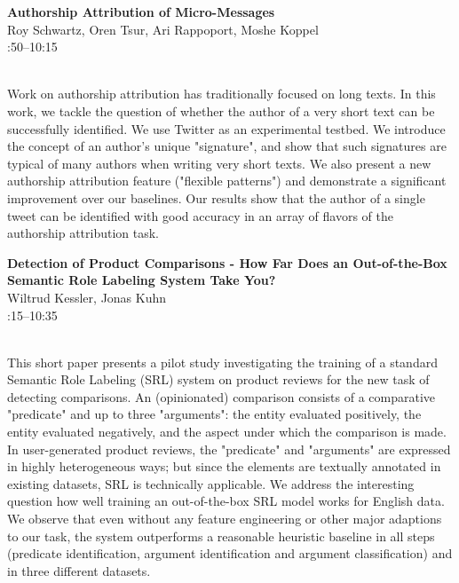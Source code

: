 \documentclass[twoside,makeidx]{book}
\renewcommand{\normalsize}{\fontsize{8}{9}\selectfont}
\renewcommand{\small}{\fontsize{7}{8}\selectfont}
\begin{document}
\par\vspace{2em}\noindent%
\begin{minipage}{\linewidth}%
\begin{center}
\textbf{\normalsize Authorship Attribution of Micro-Messages}\\
\normalsize  Roy Schwartz,  Oren Tsur,  Ari Rappoport,  Moshe Koppel\\
{\small 9:50--10:15}\\
\end{center}
\end{minipage}\\[0.5em]
\nopagebreak%
\noindent%
{\small Work on authorship attribution has traditionally focused on long texts. In this work, we tackle the question of whether the author of a very short text can be successfully identified. We use Twitter as an experimental testbed. We introduce the concept of an author's unique "signature", and show that such signatures are typical of many authors when writing very short texts. We also present a new authorship attribution feature ("flexible patterns") and demonstrate a significant improvement over our baselines. Our results show that the author of a single tweet can be identified with good accuracy in an array of flavors of the authorship attribution task.}
\par\vspace{2em}\noindent%
\begin{minipage}{\linewidth}%
\begin{center}
\textbf{\normalsize Detection of Product Comparisons - How Far Does an Out-of-the-Box Semantic Role Labeling System Take You?}\\
\normalsize  Wiltrud Kessler,  Jonas Kuhn\\
{\small 10:15--10:35}\\
\end{center}
\end{minipage}\\[0.5em]
\nopagebreak%
\noindent%
{\small This short paper presents a pilot study investigating the training of a standard Semantic Role Labeling (SRL) system on product reviews for the new task of detecting comparisons. An (opinionated) comparison consists of a comparative "predicate" and up to three "arguments": the entity evaluated positively, the entity evaluated negatively, and the aspect under which the comparison is made. In user-generated product reviews, the "predicate" and "arguments" are expressed in highly heterogeneous ways; but since the elements are textually annotated in existing datasets, SRL is technically applicable. We address the interesting question how well training an out-of-the-box SRL model works for English data. We observe that even without any feature engineering or other major adaptions to our task, the system outperforms a reasonable heuristic baseline in all steps (predicate identification, argument identification and argument classification) and in three different datasets.}
\clearpage
\end{document}
